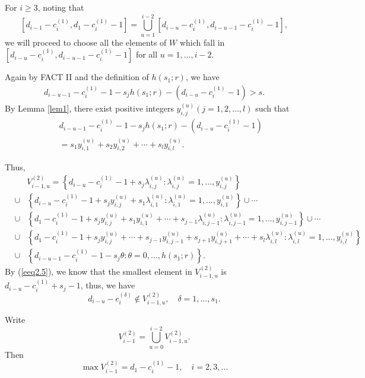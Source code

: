 \documentclass[12pt]{article}
\numberwithin{equation}{section}
\begin{document}
For $i\geq 3$, noting that
$$\left[d_{i-1}-c_{i}^{(1)}, d_{1}-c_{i}^{(1)}-1\right]=\bigcup\limits_{u=1}^{i-2}\left[d_{i-u}-c_{i}^{(1)}, d_{i-u-1}-c_{i}^{(1)}-1\right],$$
we will proceed to choose all the elements of $W$ which fall in $\left[d_{i-u}-c_{i}^{(1)}, d_{i-u-1}-c_{i}^{(1)}-1\right]$ for all $u=1,\ldots, i-2$.

Again by FACT II and the definition of $h(s_1;r)$, we have
\begin{eqnarray*}
d_{i-u-1}-c_{i}^{(1)}-1-s_j h(s_1;r)-\left(d_{i-u}-c_{i}^{(1)}-1\right)>s.\end{eqnarray*}
By Lemma \ref{lem1}, there exist positive integers $y_{i,j}^{(u)}(j=1,2,\ldots,l)$ such that
\begin{eqnarray*}
&&d_{i-u-1}-c_{i}^{(1)}-1-s_j h(s_1;r)-(d_{i-u}-c_{i}^{(1)}-1)\\
&&=s_1y_{i,1}^{(u)}+s_2y_{i,2}^{(u)}+\cdots+s_l y_{i,l}^{(u)}.\end{eqnarray*}

Thus,
\begin{eqnarray}\label{eeq2.5}&&V_{i-1,u}^{(2)}=\left\{d_{i-u}-c_{i}^{(1)}-1+s_j \lambda_{i,j}^{(u)}:\lambda_{i,j}^{(u)}=1,\ldots,y_{i,j}^{(u)}\right\}\\ \nonumber
&\cup&\left\{ d_{i-u}-c_{i}^{(1)}-1+s_j y_{i,j}^{(u)}+s_1 \lambda_{i,1}^{(u)}:\lambda_{i,1}^{(u)}=1,\ldots,y_{i,1}^{(u)}\right\}\cup \cdots\\ \nonumber
&\cup&\left\{d_{1}-c_{i}^{(1)}-1+s_j y_{i,j}^{(u)}+s_1y_{i,1}^{(u)}+\cdots+s_{j-1}\lambda_{i,j-1}^{(u)}:\lambda_{i,j-1}^{(u)}=1,\ldots,y_{i,j-1}^{(u)}\right\}\cup \cdots\\ \nonumber
&\cup&\left\{d_{1}-c_{i}^{(1)}-1+s_j y_{i,j}^{(u)}+\cdots+s_{j-1}y_{i,j-1}^{(u)}+s_{j+1}y_{i,j+1}^{(u)}+\cdots+s_{l}\lambda_{i,l}^{(u)}:\lambda_{i,l}^{(u)}=1,\ldots,y_{i,l}^{(u)}\right\}\\ \nonumber
&\cup&\left\{ d_{i-u-1}-c_{i}^{(1)}-1-s_j \theta:\theta=0,\dots,h(s_1;r)\right\}.\nonumber\end{eqnarray}
By (\ref{eeq2.5}), we know that the smallest element in $V_{i-1,u}^{(2)}$ is $d_{i-u}-c_{i}^{(1)}+s_j-1$, thus, we have
\begin{equation}\label{iv-c} d_{i-u}-c_{i}^{(\delta)}\notin V_{i-1,u}^{(2)}, \quad \delta=1,\ldots,s_1.\tag{iv-c}\end{equation}

Write $$V_{i-1}^{(2)}=\bigcup\limits_{u=0}^{i-2}V_{i-1,u}^{(2)}.$$
Then $$\max V_{i-1}^{(2)}=d_1-c_{i}^{(1)}-1, \quad i=2,3,\ldots$$
\end{document}
